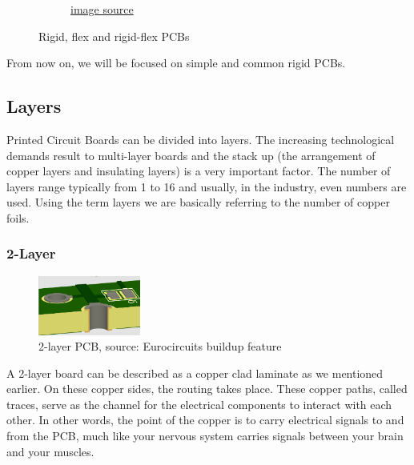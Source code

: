 \documentclass[final]{cubedoc}
\begin{document}
\begin{figure}[h!]
\begin{subfigure}{.3\textwidth}
			\caption{\href{https://web.archive.org/web/20200813145720/https://www.allaboutcircuits.com/technical-articles/pcbs-rigid-vs.-flexible-which-one-is-best-for-your-next-project/}{image source}}
			\label{fig:sub2}
		\end{subfigure}
		\caption{Rigid, flex and rigid-flex PCBs}
		\label{fig:test}
	\end{figure}
	
	From now on, we will be focused on simple and common rigid PCBs.
	
	\subsection{Layers}
	
	Printed Circuit Boards can be divided into layers. The increasing technological demands result to multi-layer boards and the stack up (the arrangement of copper layers and insulating layers)  is a very important factor. The number of layers range typically from 1 to 16 %
	and usually, in the industry, even numbers are used. Using the term layers we are basically referring to the number of copper foils.
	
	\subsubsection{2-Layer}
	
	\begin{figure}
		\centering
		\includegraphics[height=.1\textheight, width=0.3\textwidth]{assets/2_layer_euro_3D.png}
		\caption{2-layer PCB, \small{source: Eurocircuits buildup feature}}
	\end{figure}
	
	A 2-layer board can be described as a copper clad laminate as we mentioned earlier. On these copper sides, the routing takes place. These copper paths, called traces, serve as the channel for the electrical components to interact with each other. In other words, the point of the copper is to carry electrical signals to and from the PCB, much like your nervous system carries signals between your brain and your muscles. 
	
\end{document}
